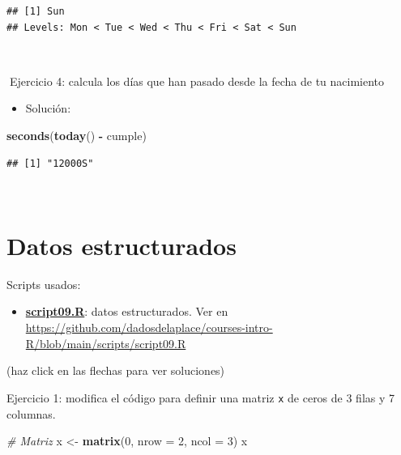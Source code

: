 \documentclass[11pt,]{book}
\newenvironment{Shaded}{\begin{snugshade}}{\end{snugshade}}
\newcommand{\CommentTok}[1]{\textcolor[rgb]{0.37,0.37,0.37}{\textit{#1}}}
\newcommand{\DataTypeTok}[1]{\textcolor[rgb]{0.27,0.27,0.27}{#1}}
\newcommand{\DecValTok}[1]{\textcolor[rgb]{0.06,0.06,0.06}{#1}}
\newcommand{\KeywordTok}[1]{\textcolor[rgb]{0.27,0.27,0.27}{\textbf{#1}}}
\newcommand{\NormalTok}[1]{#1}
\newcommand{\OperatorTok}[1]{\textcolor[rgb]{0.43,0.43,0.43}{\textbf{#1}}}
\newcommand{\StringTok}[1]{\textcolor[rgb]{0.5,0.5,0.5}{#1}}
\providecommand{\tightlist}{%
  \setlength{\itemsep}{0pt}\setlength{\parskip}{0pt}}
\begin{document}
\begin{verbatim}
## [1] Sun
## Levels: Mon < Tue < Wed < Thu < Fri < Sat < Sun
\end{verbatim}

~

📝Ejercicio 4: calcula los días que han pasado desde la fecha de tu nacimiento

\begin{itemize}
\tightlist
\item
  Solución:
\end{itemize}

\begin{Shaded}
\begin{Highlighting}[]
\KeywordTok{seconds}\NormalTok{(}\KeywordTok{today}\NormalTok{() }\OperatorTok{-}\StringTok{ }\NormalTok{cumple)}
\end{Highlighting}
\end{Shaded}

\begin{verbatim}
## [1] "12000S"
\end{verbatim}

~

\hypertarget{datos-estructurados}{%
\section{Datos estructurados}\label{datos-estructurados}}

\begin{blackbox}

Scripts usados:

\begin{itemize}
\tightlist
\item
  \href{https://github.com/dadosdelaplace/courses-intro-R/blob/main/scripts/script09.R}{\textbf{script09.R}}: datos estructurados. Ver en \url{https://github.com/dadosdelaplace/courses-intro-R/blob/main/scripts/script09.R}
\end{itemize}


\end{blackbox}

(haz click en las flechas para ver soluciones)

Ejercicio 1: modifica el código para definir una matriz \texttt{x} de ceros de 3 filas y 7 columnas.

\begin{Shaded}
\begin{Highlighting}[]
\CommentTok{# Matriz}
\NormalTok{x <-}\StringTok{ }\KeywordTok{matrix}\NormalTok{(}\DecValTok{0}\NormalTok{, }\DataTypeTok{nrow =} \DecValTok{2}\NormalTok{, }\DataTypeTok{ncol =} \DecValTok{3}\NormalTok{)}
\NormalTok{x}
\end{Highlighting}
\end{Shaded}
\end{document}
